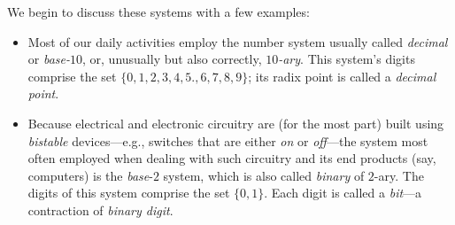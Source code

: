 \medskip

\noindent {}

\medskip

\noindent
We begin to discuss these systems with a few examples:
\begin{itemize}
\item
Most of our daily activities employ the number system usually called
{\it decimal} or {\it base-$10$}, or, unusually but also correctly,
{\it $10$-ary}.   
 
This system's digits comprise the set $\{0, 1, 2, 3, 4, 5., 6, 7, 8,
9\}$; its radix point is called a {\em decimal point}.

\item
Because electrical and electronic circuitry are (for the most part)
built using {\it bistable} devices---e.g., switches that are either
{\em on} or {\em off}---the system most often employed when dealing
with such circuitry and its end products (say, computers) is the
{\it base}-$2$ system, which is also called {\it binary} of $2$-ary.
The digits of this system comprise the set $\{0, 1\}$.  Each digit is
called a {\it bit}---a contraction of {\it binary digit}.


\end{itemize}
